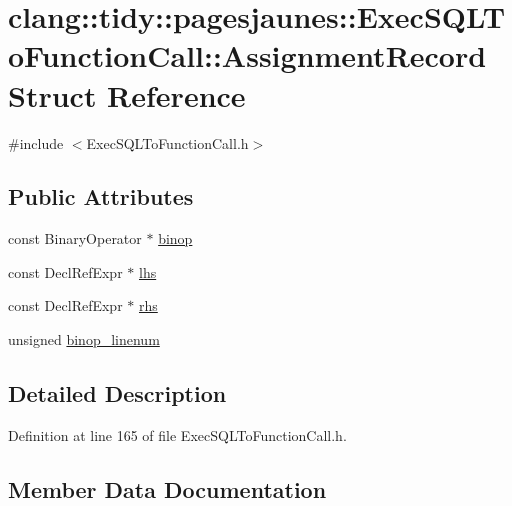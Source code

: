 \hypertarget{structclang_1_1tidy_1_1pagesjaunes_1_1_exec_s_q_l_to_function_call_1_1_assignment_record}{}\section{clang\+:\+:tidy\+:\+:pagesjaunes\+:\+:Exec\+S\+Q\+L\+To\+Function\+Call\+:\+:Assignment\+Record Struct Reference}
\label{structclang_1_1tidy_1_1pagesjaunes_1_1_exec_s_q_l_to_function_call_1_1_assignment_record}


{\ttfamily \#include $<$Exec\+S\+Q\+L\+To\+Function\+Call.\+h$>$}

\subsection*{Public Attributes}
\begin{DoxyCompactItemize}
\item 
const Binary\+Operator $\ast$ \hyperlink{structclang_1_1tidy_1_1pagesjaunes_1_1_exec_s_q_l_to_function_call_1_1_assignment_record_ac23f86657422eec11a56a853ba9d3cd0}{binop}
\item 
const Decl\+Ref\+Expr $\ast$ \hyperlink{structclang_1_1tidy_1_1pagesjaunes_1_1_exec_s_q_l_to_function_call_1_1_assignment_record_aab608512650bd18d7c5d4e4a48cddbdb}{lhs}
\item 
const Decl\+Ref\+Expr $\ast$ \hyperlink{structclang_1_1tidy_1_1pagesjaunes_1_1_exec_s_q_l_to_function_call_1_1_assignment_record_a492361f28ded0085f8322549b338f713}{rhs}
\item 
unsigned \hyperlink{structclang_1_1tidy_1_1pagesjaunes_1_1_exec_s_q_l_to_function_call_1_1_assignment_record_a1d037aeafc3a21640a661c82fbe63517}{binop\+\_\+linenum}
\end{DoxyCompactItemize}


\subsection{Detailed Description}


Definition at line 165 of file Exec\+S\+Q\+L\+To\+Function\+Call.\+h.



\subsection{Member Data Documentation}
\mbox{\label{structclang_1_1tidy_1_1pagesjaunes_1_1_exec_s_q_l_to_function_call_1_1_assignment_record_ac23f86657422eec11a56a853ba9d3cd0}} 
